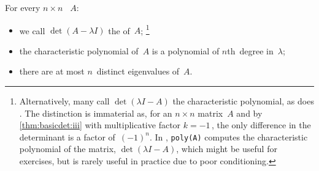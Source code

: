 \begin{theorem} \label{thm:geecp}
For every \(n\times n\) ~\(A\):
\begin{itemize}
\item we call \(\det(A-\lambda I)\) the  of~\(A\);
\footnote{Alternatively, many call \(\det(\lambda I-A)\) the characteristic polynomial, as does \script.  
The distinction is immaterial as,  for an \(n\times n\) matrix~\(A\) and by \autoref{thm:basicdet:iii} with multiplicative factor \(k=-1\)\,, the only difference in the determinant is a factor of~\((-1)^n\).
In \script, \texttt{poly(A)} computes the characteristic polynomial of the matrix,  \(\det(\lambda I-A)\), which might be useful for exercises, but is rarely useful in practice due to poor conditioning.}
\item the characteristic polynomial of~\(A\) is a polynomial of \(n\)th~degree in~\(\lambda\);
\item  there are at most \(n\)~distinct eigenvalues of~\(A\).
\end{itemize}
\end{theorem}


